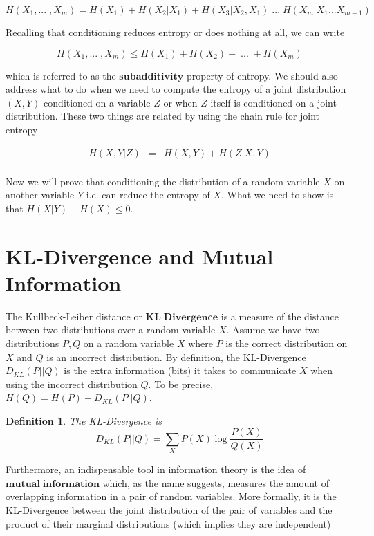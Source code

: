 \documentclass[a4paper,11pt]{book}
\newtheorem{definition}{Definition}
\begin{document}
\begin{equation*}
H(X_{1}, ...\;, X_{m}) = H(X_{1}) + H(X_{2}|X_{1}) + H(X_{3}|X_{2},X_{1}) \;...\; H(X_{m}|X_{1} ... X_{m-1}) 
\end{equation*}

Recalling that conditioning reduces entropy or does nothing at all, we can write

\begin{equation*}
H(X_{1}, ...\;, X_{m}) \leq H(X_{1}) + H(X_{2}) +  \;...\; + H(X_{m}) 
\end{equation*}

which is referred to as the $\mathbf{subadditivity}$ property of entropy. We should also address what to do when we need to compute the entropy of a joint distribution $(X,Y)$ conditioned on a variable $Z$ or when $Z$ itself is conditioned on a joint distribution. These two things are related by using the chain rule for joint entropy

\begin{eqnarray*}
H(X,Y|Z) &=& H(X,Y) + H(Z|X,Y)\\
\end{eqnarray*}


Now we will prove that conditioning the distribution of a random variable $X$ on another variable $Y$ i.e. can reduce the entropy of $X$. What we need to show is that $H(X|Y) - H(X) \leq 0$.


\section{KL-Divergence and Mutual Information}

The Kullbeck-Leiber distance or $\mathbf{KL\;Divergence}$ is a measure of the distance between two distributions over a random variable $X$. Assume we have two distributions $P,Q$ on a random variable $X$ where $P$ is the correct distribution on $X$ and $Q$ is an incorrect distribution. By definition, the KL-Divergence $D_{KL}(P||Q)$ is the extra information (bits) it takes to communicate $X$ when using the incorrect distribution $Q$. To be precise, $H(Q) = H(P) + D_{KL}(P||Q)$.

\begin{definition}
The KL-Divergence is 
\begin{equation*}
D_{KL}(P||Q) = \sum_{X} P(X) \log \frac{P(X)}{Q(X)}
\end{equation*}
\end{definition}

Furthermore, an indispensable tool in information theory is the idea of $\mathbf{mutual\;information}$ which, as the name suggests, measures the amount of overlapping information in a pair of random variables. More formally, it is the KL-Divergence between the joint distribution of the pair of variables and the product of their marginal distributions (which implies they are independent)
\end{document}
